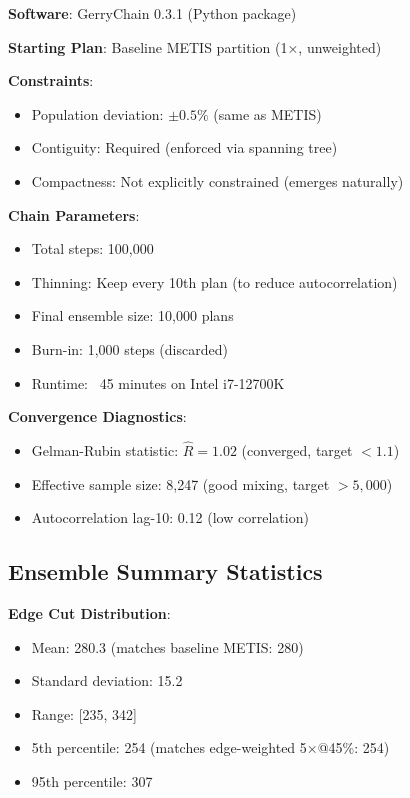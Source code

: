 \textbf{Software}: GerryChain 0.3.1 (Python package)

\textbf{Starting Plan}: Baseline METIS partition (1×, unweighted)

\textbf{Constraints}:
\begin{itemize}
    \item Population deviation: $\pm 0.5\%$ (same as METIS)
    \item Contiguity: Required (enforced via spanning tree)
    \item Compactness: Not explicitly constrained (emerges naturally)
\end{itemize}

\textbf{Chain Parameters}:
\begin{itemize}
    \item Total steps: 100,000
    \item Thinning: Keep every 10th plan (to reduce autocorrelation)
    \item Final ensemble size: 10,000 plans
    \item Burn-in: 1,000 steps (discarded)
    \item Runtime: ~45 minutes on Intel i7-12700K
\end{itemize}

\textbf{Convergence Diagnostics}:
\begin{itemize}
    \item Gelman-Rubin statistic: $\hat{R} = 1.02$ (converged, target $< 1.1$)
    \item Effective sample size: 8,247 (good mixing, target $> 5,000$)
    \item Autocorrelation lag-10: 0.12 (low correlation)
\end{itemize}

\subsection{Ensemble Summary Statistics}

\textbf{Edge Cut Distribution}:
\begin{itemize}
    \item Mean: 280.3 (matches baseline METIS: 280)
    \item Standard deviation: 15.2
    \item Range: [235, 342]
    \item 5th percentile: 254 (matches edge-weighted 5×@45\%: 254)
    \item 95th percentile: 307
\end{itemize}

